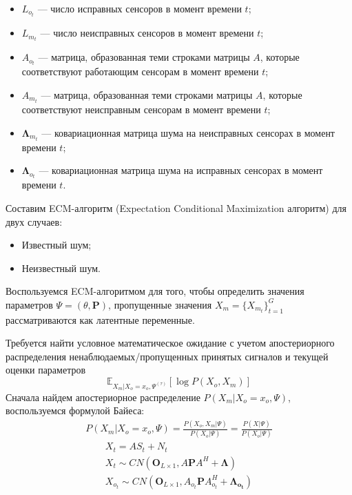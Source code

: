 \documentclass[11pt]{article}
\newcommand{\Expect}{\mathbb{E}}
\begin{document}
\begin{itemize}
\item
$L_{o_t}$ --- число исправных сенсоров в момент времени $t$;
\item
 $L_{m_t}$ --- число неисправных сенсоров в момент времени $t$;
\item 
$A_{o_t}$ --- матрица, образованная теми строками матрицы $A$, которые соответствуют работающим сенсорам в момент времени $t$; 
\item
$A_{m_t}$ --- матрица, образованная теми строками матрицы $A$, которые соответствуют неисправным сенсорам в момент времени $t$;
\item
$\mathbf{\Lambda}_{m_t}$ --- ковариационная матрица шума на неисправных сенсорах в момент времени $t$;
\item 
 $\mathbf{\Lambda}_{o_t}$ --- ковариационная матрица шума на исправных сенсорах в момент времени $t$.
\end{itemize}
Составим ECM-алгоритм (Expectation Conditional Maximization алгоритм) для двух случаев:
\begin{itemize}
\item
Известный шум;
\item
Неизвестный шум.
\end{itemize}
\clearpage
\begin{center}
\fontsize{16}{20}\selectfont {}
\end{center}
Воспользуемся ECM-алгоритмом для того, чтобы определить значения параметров $\Psi = (\theta, \mathbf{P})$, пропущенные значения $X_m=\{X_{m_t}\}_{t=1}^G$ рассматриваются как латентные переменные.
\begin{center}
\fontsize{14}{18}\selectfont {}
\end{center}
Требуется найти условное математическое ожидание с учетом апостериорного распределения ненаблюдаемых/пропущенных принятых сигналов и текущей оценки параметров
\begin{equation}
 \Expect_{X_m|X_o=x_o, \Psi^{(\tau)}}[\log P(X_o, X_m)]
\end{equation}
Сначала найдем апостериорное распределение $P(X_m|X_o=x_o,\Psi)$, воспользуемся формулой Байеса:
\begin{gather}
P(X_m|X_o=x_o,\Psi) = \frac{P(X_o, X_m|\Psi)}{P(X_o|\Psi)} = \frac{P(X|\Psi)}{P(X_o|\Psi)}
\end{gather}
\begin{gather*}
X_t = AS_t + N_t \\
X_t \sim CN(\mathbf{O}_{L \times 1}, A\mathbf{P}A^H + \mathbf{\Lambda})\\
X_{o_t} \sim CN(\mathbf{O}_{L \times 1}, A_{o_t}\mathbf{P}A_{o_t}^H + \mathbf{\Lambda_{o_t}})\\
\end{gather*}
\end{document}
